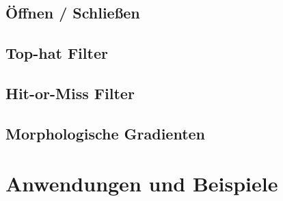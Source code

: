 \documentclass{beamer}
\begin{document}
\subsection{Öffnen / Schließen}

\subsection{Top-hat Filter}

\subsection{Hit-or-Miss Filter}

\subsection{Morphologische Gradienten}


\section{Anwendungen und Beispiele}
\end{document}
